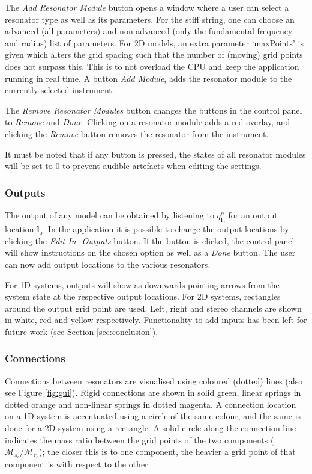 \documentclass{article}
\begin{document}
The \textit{Add Resonator Module} button opens a window where a user can select a resonator type as well as its parameters. For the stiff string, one can choose an advanced (all parameters) and non-advanced (only the fundamental frequency and radius) list of parameters. For 2D models, an extra parameter `maxPoints' is given which alters the grid spacing such that the number of (moving) grid points does not surpass this. This is to not overload the CPU and keep the application running in real time. A button \textit{Add Module}, adds the resonator module to the currently selected instrument.

The \textit{Remove Resonator Modules} button changes the buttons in the control panel to \textit{Remove} and \textit{Done}. Clicking on a resonator module adds a red overlay, and clicking the \textit{Remove} button removes the resonator from the instrument.

It must be noted that if any button is pressed, the states of all resonator modules will be set to 0 to prevent audible artefacts when editing the settings. 


\subsubsection{Outputs}
The output of any model can be obtained by listening to $q_{\boldsymbol{l}_\text{o}}^n$ for an output location $\boldsymbol{l}_\text{o}$. In the application it is possible to change the output locations by clicking the \textit{Edit In- Outputs} button. If the button is clicked, the control panel will show instructions on the chosen option as well as a \textit{Done} button. The user can now add output locations to the various resonators. 

For 1D systems, outputs will show as downwards pointing arrows from the system state at the respective output locations. For 2D systems, rectangles around the output grid point are used. Left, right and stereo channels are shown in white, red and yellow respectively. Functionality to add inputs has been left for future work (see Section \ref{sec:conclusion}).

\subsubsection{Connections}\label{sec:connectionsApp}
Connections between resonators are visualised using coloured (dotted) lines (also see Figure \ref{fig:gui}). Rigid connections are shown in solid green, linear springs in dotted orange and non-linear springs in dotted magenta. A connection location on a 1D system is accentuated using a circle of the same colour, and the same is done for a 2D system using a rectangle. A solid circle along the connection line indicates the mass ratio between the grid points of the two components ($\mathcal{M}_{s_c} / \mathcal{M}_{r_c}$); the closer this is to one component, the heavier a grid point of that component is with respect to the other.  
\end{document}
